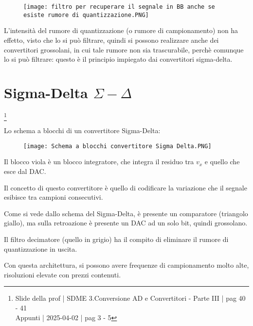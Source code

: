 \begin{figure}[h]
    \centering
    \texttt{[image: filtro per recuperare il segnale in BB anche se esiste rumore di quantizzazione.PNG]}
\end{figure}

\newpage 

L'intensità del rumore di quantizzazione (o rumore di campionamento) non ha effetto, visto che lo si può filtrare, 
quindi si possono realizzare anche dei convertitori grossolani, in cui tale rumore non sia trascurabile, 
perchè comunque lo si può filtrare: questo è il principio impiegato dai convertitori sigma-delta. \newline 

\newpage 

\section{Sigma-Delta $\Sigma - \Delta$}
\footnote{Slide della prof | SDME 3.Conversione AD e Convertitori - Parte III | pag 40 - 41 \\  
Appunti | 2025-04-02 | pag 3 - 5}

Lo schema a blocchi di un convertitore Sigma-Delta:

\begin{figure}[h]
    \centering
    \texttt{[image: Schema a blocchi convertitore Sigma Delta.PNG]}
\end{figure}

Il blocco viola è un blocco integratore, che integra il residuo tra $v_x$ e quello che esce dal DAC. \newline 

Il concetto di questo convertitore è quello di codificare la variazione che il segnale esibisce tra campioni consecutivi. \newline 

Come si vede dallo schema del Sigma-Delta, è presente un comparatore (triangolo giallo), 
ma sulla retroazione è presente un DAC ad un solo bit, quindi grossolano. \newline 

Il filtro decimatore (quello in grigio) ha il compito di eliminare il rumore di quantizzazione in uscita. \newline 

Con questa architettura, si possono avere frequenze di campionamento molto alte, risoluzioni elevate con prezzi contenuti. \newline 


